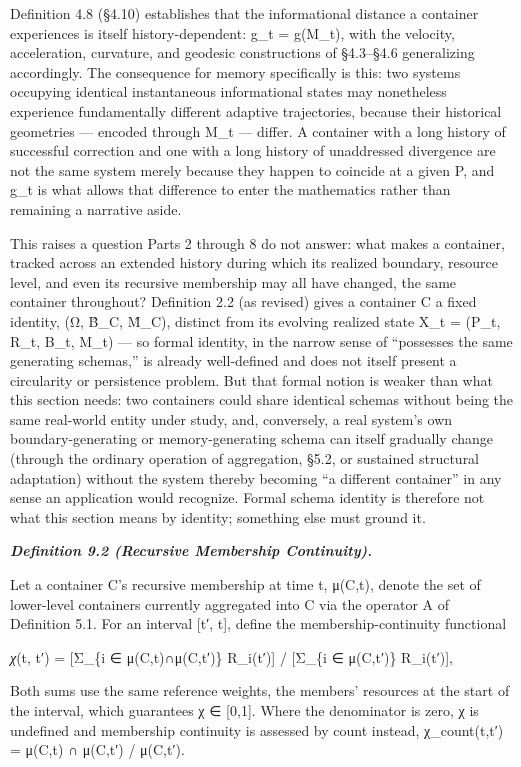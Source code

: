 \documentclass[
]{article}
\begin{document}
Definition 4.8 (§4.10) establishes that the informational distance a
container experiences is itself history-dependent: g\_t = g(M\_t), with
the velocity, acceleration, curvature, and geodesic constructions of
§4.3--§4.6 generalizing accordingly. The consequence for memory
specifically is this: two systems occupying identical instantaneous
informational states may nonetheless experience fundamentally different
adaptive trajectories, because their historical geometries --- encoded
through M\_t --- differ. A container with a long history of successful
correction and one with a long history of unaddressed divergence are not
the same system merely because they happen to coincide at a given P, and
g\_t is what allows that difference to enter the mathematics rather than
remaining a narrative aside.

This raises a question Parts 2 through 8 do not answer: what makes a
container, tracked across an extended history during which its realized
boundary, resource level, and even its recursive membership may all have
changed, the same container throughout? Definition 2.2 (as revised)
gives a container C a fixed identity, (Ω, B̂\_C, M̂\_C), distinct from its
evolving realized state X\_t = (P\_t, R\_t, B\_t, M\_t) --- so formal
identity, in the narrow sense of ``possesses the same generating
schemas,'' is already well-defined and does not itself present a
circularity or persistence problem. But that formal notion is weaker
than what this section needs: two containers could share identical
schemas without being the same real-world entity under study, and,
conversely, a real system's own boundary-generating or memory-generating
schema can itself gradually change (through the ordinary operation of
aggregation, §5.2, or sustained structural adaptation) without the
system thereby becoming ``a different container'' in any sense an
application would recognize. Formal schema identity is therefore not
what this section means by identity; something else must ground it.

\emph{\textbf{Definition 9.2 (Recursive Membership Continuity).}}

Let a container C's recursive membership at time t, μ(C,t), denote the
set of lower-level containers currently aggregated into C via the
operator A of Definition 5.1. For an interval {[}t′, t{]}, define the
membership-continuity functional

\emph{χ}(t, t′) = {[}Σ\_\{i ∈ μ(C,t)∩μ(C,t′)\} R\_i(t′){]} / {[}Σ\_\{i ∈
μ(C,t′)\} R\_i(t′){]},

Both sums use the same reference weights, the members' resources at the
start of the interval, which guarantees χ ∈ {[}0,1{]}. Where the
denominator is zero, χ is undefined and membership continuity is
assessed by count instead, χ\_count(t,t′) = \textbar μ(C,t) ∩
μ(C,t′)\textbar{} / \textbar μ(C,t′)\textbar.
\end{document}
